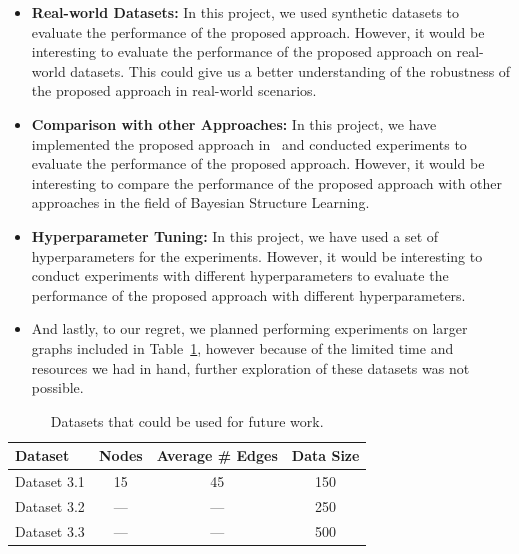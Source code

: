 \documentclass{lxaiproposal}
\begin{document}
    \begin{itemize}
        \item \textbf{Real-world Datasets:} In this project, we used synthetic datasets to evaluate the performance of
        the proposed approach. However, it would be interesting to evaluate the performance of the proposed approach
        on real-world datasets. This could give us a better understanding of the robustness of the proposed approach
        in real-world scenarios.
        \item \textbf{Comparison with other Approaches:} In this project, we have implemented the proposed approach
        in~\cite{deleu2022daggflownet} and conducted experiments to evaluate the performance of the proposed approach.
        However, it would be interesting to compare the performance of the proposed approach with other approaches in
        the field of Bayesian Structure Learning.
        \item \textbf{Hyperparameter Tuning:} In this project, we have used a set of hyperparameters for the
        experiments. However, it would be interesting to conduct experiments with different hyperparameters to
        evaluate the performance of the proposed approach with different hyperparameters.
        \item And lastly, to our regret, we planned performing experiments on larger graphs included in
        Table~\ref{tab:future_dataset}, however because of the limited time and resources we had in hand,
        further exploration of these datasets was not possible.
    \end{itemize}

    \begin{table}[h]
        \centering
        \begin{tabular}{|l|c|c|c|}
            \hline
            \textbf{Dataset} & \textbf{Nodes} & \textbf{Average \# Edges} & \textbf{Data Size} \\
            \hline
            Dataset 3.1      & 15             & 45                        & 150                \\
            Dataset 3.2      & ---            & ---                       & 250                \\
            Dataset 3.3      & ---            & ---                       & 500                \\
            \hline
        \end{tabular}
        \caption{Datasets that could be used for future work.}
        \label{tab:future_dataset}
    \end{table}
\end{document}
